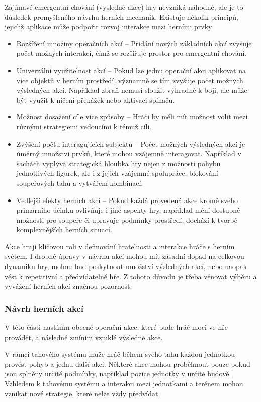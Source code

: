 Zajímavé emergentní chování (výsledné akce) hry nevzniká náhodně, ale je to důsledek promyšleného návrhu herních mechanik. Existuje několik principů, jejichž aplikace může podpořit rozvoj interakce mezi herními prvky:

\begin{itemize}
    \item Rozšíření množiny operačních akcí -- Přidání nových základních akcí zvyšuje počet možných interakcí, čímž se rozšiřuje prostor pro emergentní chování.
    \item Univerzální využitelnost akcí -- Pokud lze jednu operační akci aplikovat na více objektů v herním prostředí, významně se tím zvyšuje počet možných výsledných akcí. Například zbraň nemusí sloužit výhradně k boji, ale může být využit k ničení překážek nebo aktivaci spínačů.
    \item Možnost dosažení cíle více způsoby – Hráči by měli mít možnost volit mezi různými strategiemi vedoucími k témuž cíli.
    \item Zvýšení počtu interagujících subjektů -- Počet možných výsledných akcí je úměrný množství prvků, které mohou vzájemně interagovat. Například v šachách vyplývá strategická hloubka hry nejen z možností pohybu jednotlivých figurek, ale i z jejich vzájemné spolupráce, blokování soupeřových tahů a vytváření kombinací.
    \item Vedlejší efekty herních akcí -- Pokud každá provedená akce kromě svého primárního účinku ovlivňuje i jiné aspekty hry, například mění dostupné možnosti pro soupeře či upravuje podmínky prostředí, dochází k tvorbě komplexnějších herních situací.
\end{itemize}

Akce hrají klíčovou roli v definování hratelnosti a interakce hráče s herním světem. I drobné úpravy v návrhu akcí mohou mít zásadní dopad na celkovou dynamiku hry, mohou buď poskytnout množství výsledných akcí, nebo naopak vést k repetitivní a předvídatelné hře. Z tohoto důvodu je třeba věnovat výběru a vyvážení herních akcí značnou pozornost.

\subsubsection{Návrh herních akcí}

V této části nastíním obecné operační akce, které bude hráč moci ve hře provádět, a následně zmíním vzniklé výsledné akce.

V rámci tahového systému může hráč během svého tahu každou jednotkou provést pohyb a jednu další akci. Některé akce mohou proběhnout pouze pokud jsou splněny určité podmínky, například pozice jednotky v určité budově. Vzhledem k tahovému systému a interakci mezi jednotkami a terénem mohou vznikat nové strategie, které nelze vždy předvídat.

